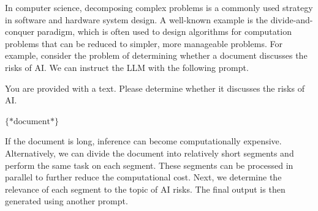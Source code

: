 In computer science, decomposing complex problems is a commonly used strategy in software and hardware system design. A well-known example is the divide-and-conquer paradigm, which is often used to design algorithms for computation problems that can be reduced to simpler, more manageable problems. For example, consider the problem of determining whether a document discusses the risks of AI. We can instruct the LLM with the following prompt.

\vspace{0.5em}
\begin{tcolorbox}

\begingroup
\setlength{\leftskip}{2em}
\setlength{\rightskip}{2em}

You are provided with a text. Please determine whether it discusses the risks of AI.

\vspace{0.5em}

$\{*\mathrm{document}*\}$

\vspace{0.5em}

\underline{\hspace{2em}}

\endgroup

\end{tcolorbox}
\vspace{0.5em}

If the document is long, inference can become computationally expensive. Alternatively, we can divide the document into relatively short segments and perform the same task on each segment. These segments can be processed in parallel to further reduce the computational cost. Next, we determine the relevance of each segment to the topic of AI risks. The final output is then generated using another prompt.

